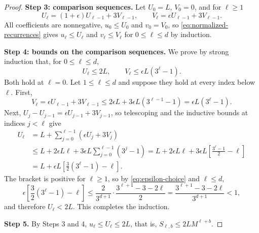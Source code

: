 \documentclass[11pt]{article}
\theoremstyle{definition}
\theoremstyle{remark}
\begin{document}
\begin{proof}
\noindent\textbf{Step 3: comparison sequences.}
Let \(U_0=L\), \(V_0=0\), and for \(\ell\ge1\)
\[
 U_\ell=(1+\epsilon)U_{\ell-1}+3V_{\ell-1},
 \qquad
 V_\ell=\epsilon U_{\ell-1}+3V_{\ell-1}.
\]
All coefficients are nonnegative, \(u_0\le U_0\) and \(v_0=V_0\), so
\eqref{eq:normalized-recurrences} gives \(u_\ell\le U_\ell\) and
\(v_\ell\le V_\ell\) for \(0\le\ell\le d\) by induction.

\medskip\noindent\textbf{Step 4: bounds on the comparison sequences.}
We prove by strong induction that, for \(0\le\ell\le d\),
\begin{equation}
\label{eq:comparison-bounds}
 U_\ell\leq2L,
 \qquad
 V_\ell\leq\epsilon L(3^\ell-1).
\end{equation}
Both hold at \(\ell=0\). Let \(1\le\ell\le d\) and suppose they hold at every
index below \(\ell\). First,
\[
 V_\ell=\epsilon U_{\ell-1}+3V_{\ell-1}
 \leq 2\epsilon L+3\epsilon L(3^{\ell-1}-1)
 =\epsilon L(3^\ell-1).
\]
Next, \(U_j-U_{j-1}=\epsilon U_{j-1}+3V_{j-1}\), so telescoping and the
inductive bounds at indices \(j<\ell\) give
\begin{align*}
 U_\ell
 &=L+\sum_{j=0}^{\ell-1}(\epsilon U_j+3V_j)\\
 &\leq L+2\epsilon L\ell
          +3\epsilon L\sum_{j=0}^{\ell-1}(3^j-1)
  =L+2\epsilon L\ell+3\epsilon L\left[\frac{3^\ell-1}{2}-\ell\right]\\
 &=L+\epsilon L\left[\frac32(3^\ell-1)-\ell\right].
\end{align*}
The bracket is positive for \(\ell\ge1\), so by \eqref{eq:epsilon-choice} and
\(\ell\le d\),
\[
 \epsilon\left[\frac32(3^\ell-1)-\ell\right]
 \leq\frac{2}{3^{d+1}}\cdot\frac{3^{\ell+1}-3-2\ell}{2}
 =\frac{3^{\ell+1}-3-2\ell}{3^{d+1}}<1,
\]
and therefore \(U_\ell<2L\). This completes the induction.

\medskip\noindent\textbf{Step 5.} By Steps 3 and 4,
\(u_\ell\le U_\ell\le2L\), that is, \(S_{\ell,b}\le2LM^{\ell+b}\).
\end{proof}
\end{document}
